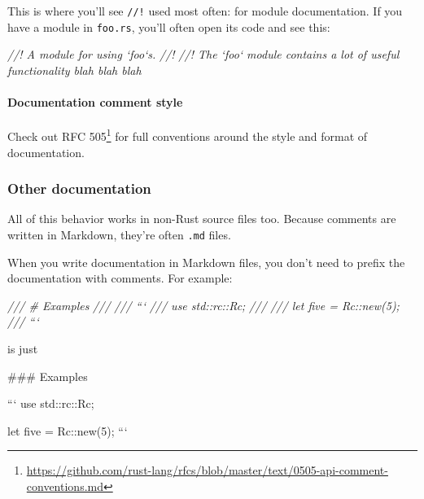 \documentclass[a4paper,]{book}
\newenvironment{Shaded}{\begin{snugshade}}{\end{snugshade}}
\newcommand{\CommentTok}[1]{\textcolor[rgb]{0.56,0.35,0.01}{\textit{{#1}}}}
\newcommand{\FunctionTok}[1]{\textcolor[rgb]{0.00,0.00,0.00}{{#1}}}
\newcommand{\NormalTok}[1]{{#1}}
\renewcommand{\href}[2]{#2\footnote{\url{#1}}}
\begin{document}
This is where you'll see \texttt{//!} used most often: for module
documentation. If you have a module in \texttt{foo.rs}, you'll often
open its code and see this:

\begin{Shaded}
\begin{Highlighting}[]
\CommentTok{//! A module for using `foo`s.}
\CommentTok{//!}
\CommentTok{//! The `foo` module contains a lot of useful functionality blah blah blah}
\end{Highlighting}
\end{Shaded}

\paragraph{Documentation comment
style}\label{documentation-comment-style}

Check out
\href{https://github.com/rust-lang/rfcs/blob/master/text/0505-api-comment-conventions.md}{RFC
505} for full conventions around the style and format of documentation.

\subsubsection{Other documentation}\label{other-documentation}

All of this behavior works in non-Rust source files too. Because
comments are written in Markdown, they're often \texttt{.md} files.

When you write documentation in Markdown files, you don't need to prefix
the documentation with comments. For example:

\begin{Shaded}
\begin{Highlighting}[]
\CommentTok{/// # Examples}
\CommentTok{///}
\CommentTok{/// ```}
\CommentTok{/// use std::rc::Rc;}
\CommentTok{///}
\CommentTok{/// let five = Rc::new(5);}
\CommentTok{/// ```}
\end{Highlighting}
\end{Shaded}

is just

\begin{Shaded}
\begin{Highlighting}[]
\FunctionTok{### Examples}

\NormalTok{```}
\NormalTok{use std::rc::Rc;}

\NormalTok{let five = Rc::new(5);}
\NormalTok{```}
\end{Highlighting}
\end{Shaded}
\end{document}
